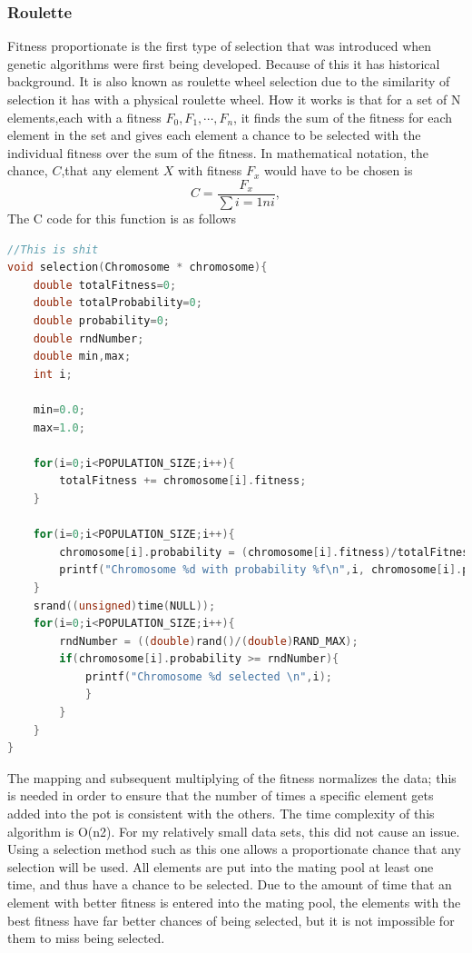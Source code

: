 \subsubsection{Roulette}
Fitness proportionate is the first type of selection that was introduced when genetic algorithms
were first being developed.
Because of this it has historical background. It is also known as roulette wheel selection due 
to the similarity of selection it has with a physical roulette wheel. 
How it works is that for a set of N elements,each with a fitness $F_{0}, F_{1}, \cdots, F_{n}$,
it finds the sum of the fitness for each element in the set and gives each element a chance to
be selected with the individual fitness over the sum of the fitness. 
In mathematical notation, the chance, $C$,that any element $X$ with fitness $F_{x}$ would have 
to be chosen is
\begin{equation}
	\label{equ:rulette_prob}
	C = \frac{F_{x}}{\sum{i=1}{n}i},
\end{equation}
The C code for this function is as follows 
\begin{lstlisting}[language=C]
//This is shit
void selection(Chromosome * chromosome){
	double totalFitness=0;
	double totalProbability=0;
	double probability=0;
	double rndNumber;
	double min,max;
	int i;

	min=0.0;
	max=1.0;

	for(i=0;i<POPULATION_SIZE;i++){
		totalFitness += chromosome[i].fitness;
	}

	for(i=0;i<POPULATION_SIZE;i++){
		chromosome[i].probability = (chromosome[i].fitness)/totalFitness;
		printf("Chromosome %d with probability %f\n",i, chromosome[i].probability);
	}
	srand((unsigned)time(NULL));
	for(i=0;i<POPULATION_SIZE;i++){
		rndNumber = ((double)rand()/(double)RAND_MAX);
		if(chromosome[i].probability >= rndNumber){
			printf("Chromosome %d selected \n",i);
			}
		}
	}
}
\end{lstlisting}
The mapping and subsequent multiplying of the fitness normalizes the data;
this is needed in order to ensure that the number of times a specific element gets added
into the pot is consistent with the others.
The time complexity of this algorithm is O(n2). For my relatively small data sets, 
this did not cause an issue. Using a selection method such as this one allows a proportionate 
chance that any selection will be used.
All elements are put into the mating pool at least one time, and thus have a chance to be 
selected. 
Due to the amount of time that an element with better fitness is entered into the mating pool,
the elements with the best fitness have far better chances of being selected, but it is not
impossible for them to miss being selected.

